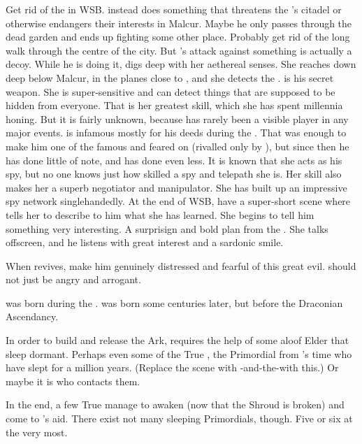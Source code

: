 Get rid of the \ghobal in WSB.
\Ishnaruchaefir instead does something that threatens the \resphain's citadel or otherwise endangers their interests in Malcur.
Maybe he only passes through the dead garden and ends up fighting \Teshrial some other place.
Probably get rid of the long walk through the centre of the city.
But \Ishnaruchaefir's attack against something is actually a decoy.
While he is doing it, \Criseis digs deep with her aethereal senses.
She reaches down deep below Malcur, in the planes close to \Nyx, and she detects the \ghobaleth.
\Criseis is his secret weapon. 
She is super-sensitive and can detect things that are supposed to be hidden from everyone.
That is her greatest skill, which she has spent millennia honing.
But it is fairly unknown, because \Criseis has rarely been a visible player in any major events.
\Ishnaruchaefir is infamous mostly for his deeds during the \secondbanewar.
That was enough to make him one of the famous and feared \dragons on \Miith (rivalled only by \Secherdamon), but since then he has done little of note, and \Criseis has done even less.
It is known that she acts as his spy, but no one knows just how skilled a spy and telepath she is.
Her skill also makes her a superb negotiator and manipulator.
She has built up an impressive spy network singlehandedly.
At the end of WSB, have a super-short scene where \Ishnaruchaefir tells her to describe to him what she has learned.
She begins to tell him something very interesting.
A surprisign and bold plan from the \resphain.
She talks offscreen, and he listens with great interest and a sardonic smile.

When \Teshrial revives, make him genuinely distressed and fearful of this great evil.
\Teshrial should not just be angry and arrogant.

\Nexagglachel was born during the \firstbanewar.
\Ishnaruchaefir was born some centuries later, but before the Draconian Ascendancy.

In order to build and release the Ark, \Ishnaruchaefir requires the help of some aloof Elder \Dragons that sleep dormant.
Perhaps even some of the True \Dragons, the Primordial \Dragons from \Sethicus's time who have slept for a million years.
(Replace the scene with \Ishnaruchaefir-and-the-\xss with this.)
Or maybe it is \Secherdamon who contacts them.

In the end, a few True \Dragons manage to awaken (now that the Shroud is broken) and come to \Ishnaruchaefir's aid.
There exist not many sleeping Primordials, though. 
Five or six at the very most.


